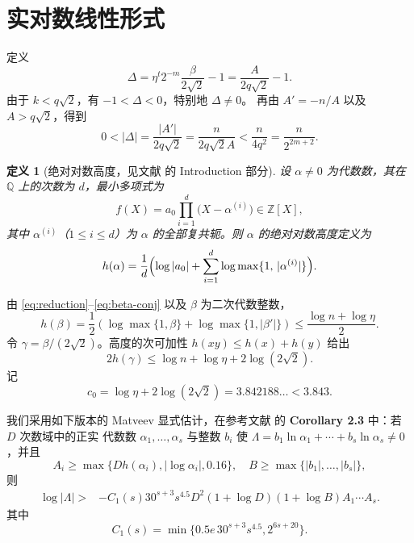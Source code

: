 \documentclass[11pt,a4paper]{ctexart}
\newtheorem{definition}[theorem]{定义}
\theoremstyle{remark}
\begin{document}
\section{实对数线性形式}
定义
\begin{equation}\label{eq:Delta}
\Delta=\eta^t2^{-m}\frac{\beta}{2\sqrt2}-1
=\frac{A}{2q\sqrt2}-1.
\end{equation}
由于 \(k<q\sqrt2\)，有 \(-1<\Delta<0\)，特别地 \(\Delta\ne0\)。
再由 \(A'=-n/A\) 以及 \(A>q\sqrt2\)，得到
\begin{equation}\label{eq:upperDelta}
0<|\Delta|=\frac{|A'|}{2q\sqrt2}
=\frac{n}{2q\sqrt2 A}
<\frac{n}{4q^2}=\frac{n}{2^{2m+2}}.
\end{equation}

\begin{definition}[绝对对数高度，见文献 \cite{NesterenkoWaldschmidt} 的 Introduction 部分]\label{def:absLogHeight}
设 $\alpha\neq 0$ 为代数数，其在 $\mathbb{Q}$ 上的次数为 $d$，最小多项式为
\[ f(X)=a_0\prod_{i=1}^{d}\bigl(X-\alpha^{(i)}\bigr)\in\mathbb{Z}[X], \]
其中 $\alpha^{(i)}$（$1\le i\le d$）为 $\alpha$ 的全部复共轭。则 $\alpha$ 的\emph{绝对对数高度}定义为
\begin{equation}\label{eq:absLogHeight}
h(\alpha)=\frac{1}{d}\Bigl(\log|a_0|+\sum_{i=1}^{d}\log\max\{1,\,|\alpha^{(i)}|\}\Bigr).
\end{equation}
\end{definition}

由 \eqref{eq:reduction}--\eqref{eq:beta-conj} 以及 \(\beta\) 为二次代数整数，
\begin{equation}\label{eq:hbeta}
h(\beta)
=\frac12\left(\log\max\{1,\beta\}
+\log\max\{1,|\beta'|\}\right)
\le\frac{\log n+\log\eta}{2}.
\end{equation}
令 \(\gamma=\beta/(2\sqrt2)\)。高度的次可加性 $h(xy)\le h(x)+h(y)$ 给出
\begin{equation}\label{eq:hgamma}
2h(\gamma)
\le \log n+\log\eta+2\log(2\sqrt2).
\end{equation}
记
\begin{equation}\label{eq:c0}
c_0=\log\eta+2\log(2\sqrt2)
=3.842188\ldots<3.843.
\end{equation}

我们采用如下版本的 Matveev 显式估计，在参考文献 \cite{Matveev} 的 \textbf{Corollary 2.3} 中：若 \(D\) 次数域中的正实
代数数 \(\alpha_1,\ldots,\alpha_s\) 与整数 \(b_i\) 使
\(\Lambda=b_1\ln{\alpha_1}+\cdots+b_s\ln{\alpha_s}\ne0\)，并且
\[ A_i\ge\max\{Dh(\alpha_i),|\log\alpha_i|,0.16\}, \quad
B\ge\max\{|b_1|,\ldots,|b_s|\}, \]
则
\begin{align}\label{eq:matveev}
\log|\Lambda| {}>&-C_1(s)30^{s+3}s^{4.5}D^2(1+\log D)(1+\log B) A_1\cdots A_s.
\end{align}
其中
\[ C_1(s)=\min\{0.5e\,30^{s+3}s^{4.5}, 2^{6s+20}\}. \]
\end{document}
